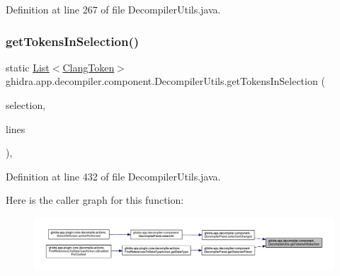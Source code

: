 Definition at line 267 of file Decompiler\+Utils.\+java.

\mbox{\label{classghidra_1_1app_1_1decompiler_1_1component_1_1_decompiler_utils_a9c0328f5ed2152cc93630a1fb5c37c90}} 
\subsubsection{\texorpdfstring{getTokensInSelection()}{getTokensInSelection()}}
{\footnotesize\ttfamily static \mbox{\hyperlink{xml_8hh_ab5ab62f46b3735557c125f91b40ac155}{List}}$<$\mbox{\hyperlink{classghidra_1_1app_1_1decompiler_1_1_clang_token}{Clang\+Token}}$>$ ghidra.\+app.\+decompiler.\+component.\+Decompiler\+Utils.\+get\+Tokens\+In\+Selection (\begin{DoxyParamCaption}\item[{Field\+Selection}]{selection,  }\item[{Field \mbox{[}$\,$\mbox{]}}]{lines }\end{DoxyParamCaption})\hspace{0.3cm}{\ttfamily [inline]}, {\ttfamily [static]}}



Definition at line 432 of file Decompiler\+Utils.\+java.

Here is the caller graph for this function\+:
\nopagebreak
\begin{figure}[H]
\begin{center}
\leavevmode
\includegraphics[width=350pt]{classghidra_1_1app_1_1decompiler_1_1component_1_1_decompiler_utils_a9c0328f5ed2152cc93630a1fb5c37c90_icgraph}
\end{center}
\end{figure}
\mbox{\label{classghidra_1_1app_1_1decompiler_1_1component_1_1_decompiler_utils_a54a63bbb674ce85f95916cb263e7ada3}} 
